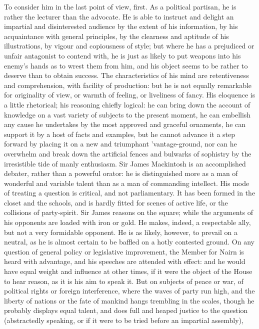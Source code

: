 To consider him in the last point of view, first. As a political
partisan, he is rather the lecturer than the advocate. He is able
to instruct and delight an impartial and disinterested audience by
the extent of his information, by his acquaintance with general
principles, by the clearness and aptitude of his illustrations, by
vigour and copiousness of style; but where he has a prejudiced or
unfair antagonist to contend with, he is just as likely to put
weapons into his enemy's hands as to wrest them from him, and his
object seems to be rather to deserve than to obtain success. The
characteristics of his mind are retentiveness and comprehension,
with facility of production: but he is not equally remarkable for
originality of view, or warmth of feeling, or liveliness of
fancy. His eloquence is a little rhetorical; his reasoning chiefly
logical: he can bring down the account of knowledge on a vast
variety of subjects to the present moment, he can embellish any
cause he undertakes by the most approved and graceful ornaments,
he can support it by a host of facts and examples, but he cannot
advance it a step forward by placing it on a new and triumphant
'vantage-ground, nor can he overwhelm and break down the
artificial fences and bulwarks of sophistry by the irresistible
tide of manly enthusiasm. Sir James Mackintosh is an accomplished
debater, rather than a powerful orator: he is distinguished more
as a man of wonderful and variable talent than as a man of
commanding intellect. His mode of treating a question is critical,
and not parliamentary. It has been formed in the closet and the
schools, and is hardly fitted for scenes of active life, or the
collisions of party-spirit. Sir James reasons on the square; while
the arguments of his opponents are loaded with iron or gold. He
makes, indeed, a respectable ally, but not a very formidable
opponent. He is as likely, however, to prevail on a neutral, as he
is almost certain to be baffled on a hotly contested ground. On
any question of general policy or legislative improvement, the
Member for Nairn is heard with advantage, and his speeches are
attended with effect: and he would have equal weight and influence
at other times, if it were the object of the House to hear reason,
as it is his aim to speak it. But on subjects of peace or war, of
political rights or foreign interference, where the waves of party
run high, and the liberty of nations or the fate of mankind hangs
trembling in the scales, though he probably displays equal talent,
and does full and heaped justice to the question (abstractedly
speaking, or if it were to be tried before an impartial assembly),
